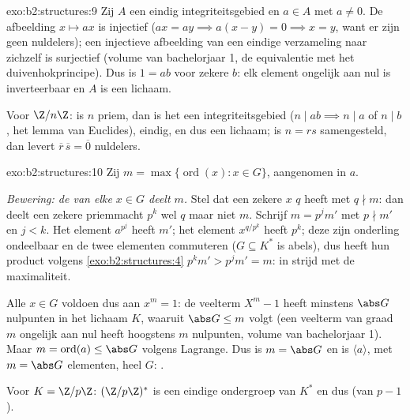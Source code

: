 \begin{solution}{exo:b2:structures:9}
Zij $A$ een eindig integriteitsgebied en $a \in A$ met $a \neq 0$.
De afbeelding $x \mapsto ax$ is injectief ($ax = ay \implies a(x -
y) = 0 \implies x = y$, want er zijn geen nuldelers); een
injectieve afbeelding van een eindige verzameling naar zichzelf is
surjectief (volume van bachelorjaar 1, de equivalentie met het
duivenhokprincipe). Dus is $1 = ab$ voor zekere $b$: elk element
ongelijk aan nul is inverteerbaar en $A$ is een lichaam.

Voor $\Z/n\Z$: is $n$ priem, dan is het een integriteitsgebied
($n \mid ab \implies n \mid a$ of $n \mid b$, het lemma van
Euclides), eindig, en dus een lichaam; is $n = rs$ samengesteld,
dan levert $\overline r\,\overline s = \overline 0$ nuldelers.
\end{solution}

\begin{solution}{exo:b2:structures:10}
Zij $m = \max\{\operatorname{ord}(x) : x \in G\}$, aangenomen in
$a$.

\emph{Bewering: de  van elke $x \in G$ deelt $m$.} Stel dat een
zekere $x$  $q$ heeft met $q \nmid m$: dan deelt een zekere
priemmacht $p^k$ wel $q$ maar niet $m$. Schrijf $m = p^j m'$ met $p
\nmid m'$ en $j < k$. Het element $a^{p^j}$ heeft  $m'$; het
element $x^{q/p^k}$ heeft  $p^k$; deze  zijn onderling
ondeelbaar en de twee elementen commuteren ($G \subseteq K^*$ is
abels), dus heeft hun product volgens \cref{exo:b2:structures:4}
 $p^k m' > p^j m' = m$: in strijd met de maximaliteit.

Alle $x \in G$ voldoen dus aan $x^m = 1$: de veelterm $X^m - 1$
heeft minstens $\abs G$ nulpunten in het lichaam $K$, waaruit
$\abs G \leq m$ volgt (een veelterm van graad $m$ ongelijk aan nul
heeft hoogstens $m$ nulpunten, volume van bachelorjaar 1). Maar
$m = \operatorname{ord}(a) \leq \abs G$ volgens Lagrange. Dus is $m
= \abs G$ en is $\langle a \rangle$, met $m = \abs G$ elementen,
heel $G$: .

Voor $K = \Z/p\Z$: $(\Z/p\Z)^*$ is een eindige ondergroep van
$K^*$ en dus  (van  $p - 1$).
\end{solution}

